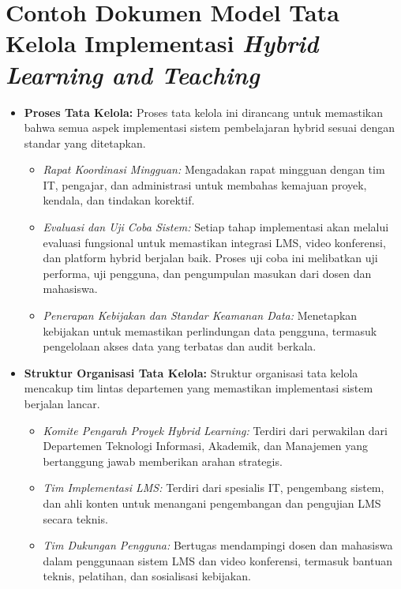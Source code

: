 \section{Contoh Dokumen Model Tata Kelola Implementasi \textit{Hybrid Learning and Teaching}}
\label{sec:contoh_dokumen_model_tata_kelola}
\begin{itemize}
	\item \textbf{Proses Tata Kelola:}
	Proses tata kelola ini dirancang untuk memastikan bahwa semua aspek implementasi sistem pembelajaran hybrid sesuai dengan standar yang ditetapkan. 
	\begin{itemize}
		\item \textit{Rapat Koordinasi Mingguan:} Mengadakan rapat mingguan dengan tim IT, pengajar, dan administrasi untuk membahas kemajuan proyek, kendala, dan tindakan korektif.
		\item \textit{Evaluasi dan Uji Coba Sistem:} Setiap tahap implementasi akan melalui evaluasi fungsional untuk memastikan integrasi LMS, video konferensi, dan platform hybrid berjalan baik. Proses uji coba ini melibatkan uji performa, uji pengguna, dan pengumpulan masukan dari dosen dan mahasiswa.
		\item \textit{Penerapan Kebijakan dan Standar Keamanan Data:} Menetapkan kebijakan untuk memastikan perlindungan data pengguna, termasuk pengelolaan akses data yang terbatas dan audit berkala.
	\end{itemize}
	
	\item \textbf{Struktur Organisasi Tata Kelola:}
	Struktur organisasi tata kelola mencakup tim lintas departemen yang memastikan implementasi sistem berjalan lancar.
	\begin{itemize}
		\item \textit{Komite Pengarah Proyek Hybrid Learning:} Terdiri dari perwakilan dari Departemen Teknologi Informasi, Akademik, dan Manajemen yang bertanggung jawab memberikan arahan strategis.
		\item \textit{Tim Implementasi LMS:} Terdiri dari spesialis IT, pengembang sistem, dan ahli konten untuk menangani pengembangan dan pengujian LMS secara teknis.
		\item \textit{Tim Dukungan Pengguna:} Bertugas mendampingi dosen dan mahasiswa dalam penggunaan sistem LMS dan video konferensi, termasuk bantuan teknis, pelatihan, dan sosialisasi kebijakan.
	\end{itemize}
	

\end{itemize}
